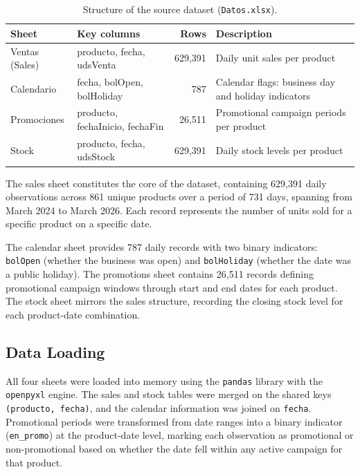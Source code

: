 \begin{table}[H]
\centering
\small
\caption{Structure of the source dataset (\texttt{Datos.xlsx}).}
\label{tab:data_sheets}
\begin{tabular}{|l|l|r|p{5.5cm}|}
\hline
\textbf{Sheet} & \textbf{Key columns} & \textbf{Rows} & \textbf{Description} \\
\hline
Ventas (Sales) & producto, fecha, udsVenta & 629,391 & Daily unit sales per product \\
\hline
Calendario & fecha, bolOpen, bolHoliday & 787 & Calendar flags: business day and holiday indicators \\
\hline
Promociones & producto, fechaInicio, fechaFin & 26,511 & Promotional campaign periods per product \\
\hline
Stock & producto, fecha, udsStock & 629,391 & Daily stock levels per product \\
\hline
\end{tabular}
\end{table}

The sales sheet constitutes the core of the dataset, containing 629,391 daily observations across 861 unique products over a period of 731 days, spanning from March 2024 to March 2026. Each record represents the number of units sold for a specific product on a specific date.

The calendar sheet provides 787 daily records with two binary indicators: \texttt{bolOpen} (whether the business was open) and \texttt{bolHoliday} (whether the date was a public holiday). The promotions sheet contains 26,511 records defining promotional campaign windows through start and end dates for each product. The stock sheet mirrors the sales structure, recording the closing stock level for each product-date combination.

\subsection{Data Loading}

All four sheets were loaded into memory using the \texttt{pandas} library with the \texttt{openpyxl} engine. The sales and stock tables were merged on the shared keys \texttt{(producto, fecha)}, and the calendar information was joined on \texttt{fecha}. Promotional periods were transformed from date ranges into a binary indicator (\texttt{en\_promo}) at the product-date level, marking each observation as promotional or non-promotional based on whether the date fell within any active campaign for that product.

